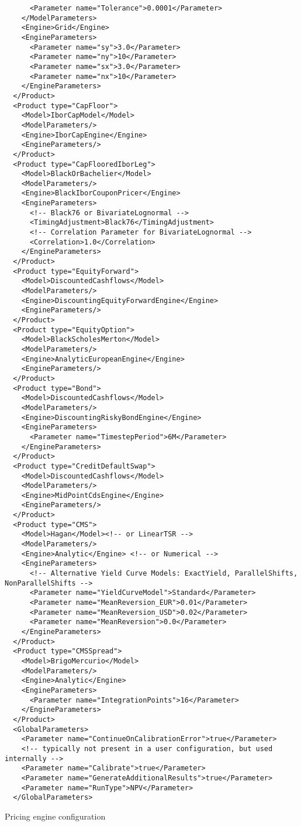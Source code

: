 \begin{longlisting}
\begin{verbatim}
      <Parameter name="Tolerance">0.0001</Parameter>
    </ModelParameters>
    <Engine>Grid</Engine>
    <EngineParameters>
      <Parameter name="sy">3.0</Parameter>
      <Parameter name="ny">10</Parameter>
      <Parameter name="sx">3.0</Parameter>
      <Parameter name="nx">10</Parameter>
    </EngineParameters>
  </Product>
  <Product type="CapFloor">
    <Model>IborCapModel</Model>
    <ModelParameters/>
    <Engine>IborCapEngine</Engine>
    <EngineParameters/>
  </Product>
  <Product type="CapFlooredIborLeg">
    <Model>BlackOrBachelier</Model>
    <ModelParameters/>
    <Engine>BlackIborCouponPricer</Engine>
    <EngineParameters>
      <!-- Black76 or BivariateLognormal -->
      <TimingAdjustment>Black76</TimingAdjustment>
      <!-- Correlation Parameter for BivariateLognormal -->
      <Correlation>1.0</Correlation>
    </EngineParameters>
  </Product>
  <Product type="EquityForward">
    <Model>DiscountedCashflows</Model>
    <ModelParameters/>
    <Engine>DiscountingEquityForwardEngine</Engine>
    <EngineParameters/>
  </Product>
  <Product type="EquityOption">
    <Model>BlackScholesMerton</Model>
    <ModelParameters/>
    <Engine>AnalyticEuropeanEngine</Engine>
    <EngineParameters/>
  </Product>
  <Product type="Bond">
    <Model>DiscountedCashflows</Model>
    <ModelParameters/>
    <Engine>DiscountingRiskyBondEngine</Engine>
    <EngineParameters>
      <Parameter name="TimestepPeriod">6M</Parameter>
    </EngineParameters>
  </Product>
  <Product type="CreditDefaultSwap">
    <Model>DiscountedCashflows</Model>
    <ModelParameters/>
    <Engine>MidPointCdsEngine</Engine>
    <EngineParameters/>
  </Product>
  <Product type="CMS">
    <Model>Hagan</Model><!-- or LinearTSR -->
    <ModelParameters/>
    <Engine>Analytic</Engine> <!-- or Numerical -->
    <EngineParameters>
      <!-- Alternative Yield Curve Models: ExactYield, ParallelShifts, NonParallelShifts -->
      <Parameter name="YieldCurveModel">Standard</Parameter> 
      <Parameter name="MeanReversion_EUR">0.01</Parameter>
      <Parameter name="MeanReversion_USD">0.02</Parameter>
      <Parameter name="MeanReversion">0.0</Parameter>
    </EngineParameters>
  </Product>
  <Product type="CMSSpread">
    <Model>BrigoMercurio</Model>
    <ModelParameters/>
    <Engine>Analytic</Engine>
    <EngineParameters>
      <Parameter name="IntegrationPoints">16</Parameter>
    </EngineParameters>
  </Product>
  <GlobalParameters>
    <Parameter name="ContinueOnCalibrationError">true</Parameter>
    <!-- typically not present in a user configuration, but used internally -->
    <Parameter name="Calibrate">true</Parameter>
    <Parameter name="GenerateAdditionalResults">true</Parameter>
    <Parameter name="RunType">NPV</Parameter>
  </GlobalParameters>
\end{verbatim}
\caption{Pricing engine configuration}
\label{lst:pricingengine_config}
\end{longlisting}

